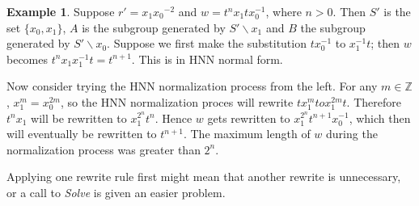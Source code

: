 \documentclass[12pt]{article} %
\theoremstyle{definition}
\theoremstyle{definition}
\theoremstyle{definition}
\theoremstyle{definition}
\theoremstyle{definition}
\theoremstyle{definition}
\newtheorem{exmpl}{Example}[theorem]
\begin{document}
\begin{exmpl}\label{ltrbad}
Suppose $r' = {x_1}{x_0}^{-2}$ and
$w = t^n x_1 t x_0^{-1}$, where $n > 0$.
Then $S'$ is the set $\{x_0, x_1\}$,
$A$ is the subgroup generated by $S' \backslash x_1$ and
$B$ the subgroup generated by $S' \backslash x_0$.
Suppose we first make the substitution $tx_0^{-1}$ to $x_1^{-1} t$;
then $w$ becomes $t^{n}x_1x_1^{-1}t = t^{n+1}$.
This is in HNN normal form.

Now consider trying the HNN normalization process from the left.
For any $m \in \mathbb{Z}$, $x_1^m = x_0^{2m}$,
so the HNN normalization proces will rewrite $tx_1^m to x_1^{2m}t$.
Therefore $t^nx_1$ will be rewritten to $x_1^{2^n}t^n$.
Hence $w$ gets rewritten to $x_1^{2^n} t^{n+1} x_0^{-1}$,
which then will eventually be rewritten to $t^{n+1}$. The maximum length
of $w$ during the normalization process was greater than $2^n$.
\end{exmpl}

Applying one rewrite rule first
might mean that another rewrite is unnecessary, or a call to \textit{Solve} is
given an easier problem.
\end{document}
